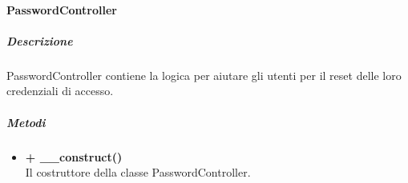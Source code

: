 	\paragraph{PasswordController}
		\subparagraph{Descrizione}
			PasswordController contiene la logica per aiutare gli utenti per il reset delle loro credenziali di accesso.
		\subparagraph{Metodi}
			\begin{itemize}
				\item \textbf{+ \_\_construct()}\\
				Il costruttore della classe PasswordController.
			\end{itemize}
	